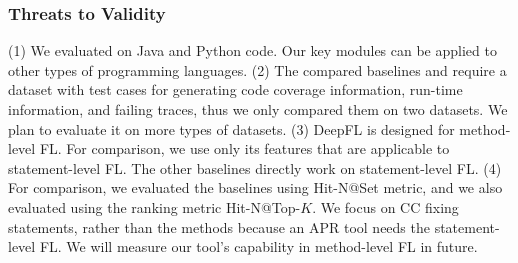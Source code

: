 \subsubsection{Threats to Validity}
(1) We evaluated {\tool} on Java and Python code. Our key modules can
be applied to other types of programming languages.  (2) The compared
baselines and {\tool} require a dataset with test cases for generating
code coverage information, run-time information, and failing traces,
thus we only compared them on two datasets. We plan to evaluate it on
more types of datasets. (3) DeepFL is designed for method-level
FL. For comparison, we use only its features that are
applicable to statement-level FL. The other baselines
directly work on statement-level FL. (4) For comparison, we
evaluated the baselines using Hit-N@Set metric, and we also evaluated
{\tool} using the ranking metric Hit-N@Top-$K$. We focus on CC fixing
statements, rather than the methods because an APR tool needs the
statement-level FL. We will measure our tool's capability in
method-level FL in future.



